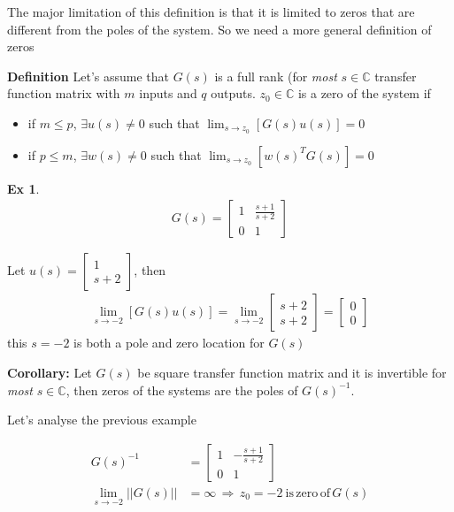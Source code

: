 \documentclass[twoside]{article}
\newtheorem{exmp}[theorem]{Ex}
\begin{document}
\vspace{12pt}

The major limitation of this definition is that it is limited to zeros that are different from the poles of the system. So we 
need a more general definition of zeros 

\textbf{Definition} Let's assume that $G(s)$ is a full rank (for \textit{most} $s \in \mathbb{C}$ transfer function matrix with $m$
inputs and $q$ outputs. $z_0 \in \mathbb{C}$ is a zero of the system if
\begin{itemize}
\item if $m \leq p$, $\exists u(s) \neq 0$ such that $\lim_{s \to z_0} [ G(s) u(s) ] = 0$
\item if $p \leq m$, $\exists w(s) \neq 0$ such that $\lim_{s \to z_0} [ w(s)^T G(s) ] = 0$
\end{itemize}
%


\begin{exmp}
	\begin{align*}
	G(s) = \left[ \begin{array}{ccc} 1 & \frac{s+1}{s+2}  \\  
	0 & 1  \end{array} \right]
	\end{align*}
\end{exmp}

Let $u(s) = \begin{bmatrix} 1 \\ s+2 \end{bmatrix}$, then
\begin{align*}
\lim_{s \to -2} [ G(s) u(s) ] = \lim_{s \to -2} \begin{bmatrix} s+2 \\ s+2 \end{bmatrix} = \begin{bmatrix} 0 \\ 0 \end{bmatrix}
\end{align*}
this $s = -2$ is both a pole and zero location for $G(s)$

\textbf{Corollary:} Let $G(s)$ be square transfer function matrix and it is invertible for \textit{most} $s \in \mathbb{C}$, then zeros of the systems
are the poles of $G(s)^{-1}$. 

Let's analyse the previous example 

\begin{align*}
G(s)^{-1} &= \left[ \begin{array}{ccc} 1 & -\frac{s+1}{s+2}  \\  
	0 & 1  \end{array} \right]
	\\
\lim_{s \to -2} || G(s) || &= \infty \, \Rightarrow \, z_0 = - 2 \ \mathrm{is} \, \mathrm{zero} \, \mathrm{of} \, G(s)
\end{align*}







\end{document}
